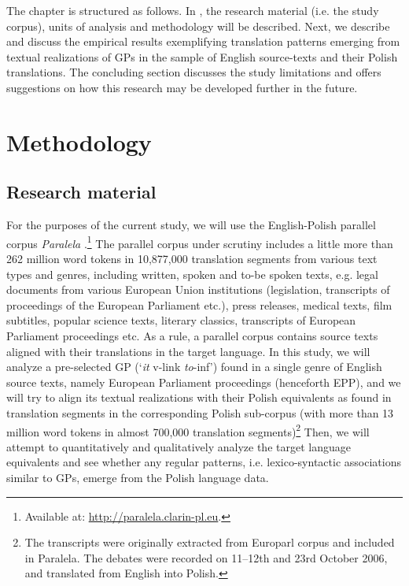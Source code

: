 \documentclass[output=paper]{langscibook}
\begin{document}
The chapter is structured as follows. In , the research material (i.e. the study corpus), units of analysis and methodology will be described. Next, we describe and discuss the empirical results exemplifying translation patterns emerging from textual realizations of GPs in the sample of English source-texts and their Polish translations. The concluding section discusses the study limitations and offers suggestions on how this research may be developed further in the future.

\section{Methodology}\label{sec:grabowski:2}
\subsection{Research material}

For the purposes of the current study, we will use the English-Polish parallel corpus \textit{Paralela} \citep{Pęzik2016}.\footnote{Available at: \url{http://paralela.clarin-pl.eu}.} The parallel corpus under scrutiny includes a little more than 262 million word tokens in 10,877,000 translation segments from various text types and genres, including written, spoken and to-be spoken texts, e.g. legal documents from various European Union institutions (legislation, transcripts of proceedings of the European Parliament etc.), press releases, medical texts, film subtitles, popular science texts, literary classics, transcripts of European Parliament proceedings etc. As a rule, a parallel corpus contains source texts aligned with their translations in the target language. In this study, we will analyze a pre-selected GP (‘\textit{it} v-link {\ADJ} \textit{to}{}-inf’) found in a single genre of English source texts, namely European Parliament proceedings (henceforth EPP), and we will try to align its textual realizations with their Polish equivalents as found in translation segments in the corresponding Polish sub-corpus (with more than 13 million word tokens in almost 700,000 translation segments)\footnote{The transcripts were originally extracted from Europarl corpus \citep{Koehn2005} and included in Paralela. The debates were recorded on 11--12th and 23rd October 2006, and translated from English into Polish.} Then, we will attempt to quantitatively and qualitatively analyze the target language equivalents and see whether any regular patterns, i.e. lexico-syntactic associations similar to GPs, emerge from the Polish language data.
\end{document}
